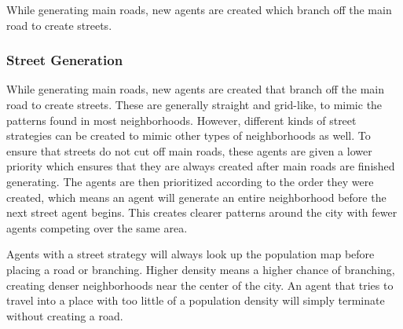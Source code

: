 While generating main roads, new agents are created which branch off the main road to create streets.

\subsubsection{Street Generation}
While generating main roads, new agents are created that branch off the main road to create streets.
These are generally straight and grid-like, to mimic the patterns found in most neighborhoods.
However, different kinds of street strategies can be created to mimic other types of neighborhoods as well.
To ensure that streets do not cut off main roads, these agents are given a lower priority which ensures that they are always created after main roads are finished generating.
The agents are then prioritized according to the order they were created, which means an agent will generate an entire neighborhood before the next street agent begins.
This creates clearer patterns around the city with fewer agents competing over the same area.

Agents with a street strategy will always look up the population map before placing a road or branching.
Higher density means a higher chance of branching, creating denser neighborhoods near the center of the city.
An agent that tries to travel into a place with too little of a population density will simply terminate without creating a road. 
